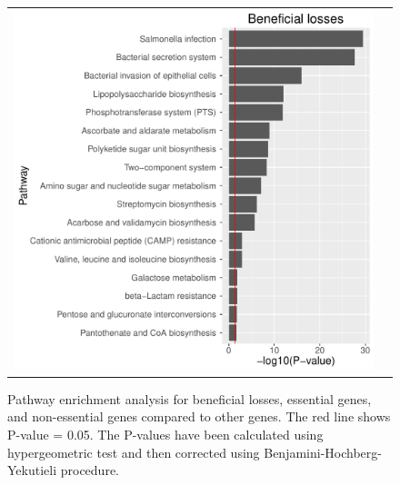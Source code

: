 \documentclass[12pt,letterpaper]{article}
\begin{document}
\begin{figure}
\begin{tabular}{c c}
\includegraphics[scale=0.4]{beneficialloss-pathways.pdf}&
\end{tabular}
\caption{Pathway enrichment analysis for beneficial losses, essential genes, and non-essential genes compared to other genes. The red line shows P-value = 0.05. The P-values have been calculated using hypergeometric test and then corrected using Benjamini-Hochberg-Yekutieli procedure.}
\label{fig:essentiality-pathway}
\end{figure}
\end{document}
